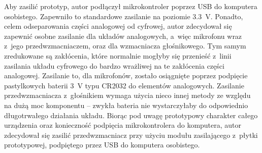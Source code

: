 Aby zasilić prototyp, autor podłączył mikrokontroler poprzez USB do komputera osobistego. Zapewniło to standardowe zasilanie na poziomie \SI{3.3}{\V}. Ponadto, celem odseparowania części analogowej od cyfrowej, autor zdecydował się zapewnić osobne zasilanie dla układów analogowych, a~więc mikrofonu wraz z~jego przedwzmacniaczem, oraz dla wzmacniacza głośnikowego. Tym samym zredukowane są zakłócenia, które normalnie mogłyby się przenieść z~linii zasilania układu cyfrowego do bardzo wrażliwej na te zakłócenia części analogowej. Zasilanie to, dla mikrofonów, zostało osiągnięte poprzez podpięcie pastylkowych baterii \SI{3}{\V} typu CR2032 do elementów analogowych. Zasilanie przedwzmacniacza z~głośnikiem wymaga użycia nieco innej metody ze względu na dużą moc komponentu -- zwykła bateria nie wystarczyłaby do odpowiednio długotrwałego działania układu. Biorąc pod uwagę prototypowy charakter całego urządzenia oraz konieczność podpięcia mikrokontrolera do komputera, autor zdecydował się zasilić przedwzmacniacz przy użyciu modułu zasilającego z~płytki prototypowej, podpiętego przez USB do komputera osobistego.